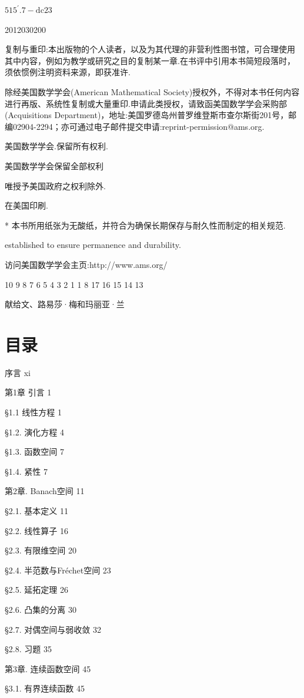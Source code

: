 \documentclass[10pt,b5paper,openany,twoside]{ctexbook}
\begin{document}
${515}^{\prime }{.7} - \mathrm{{dc}}{23}$

2012030200

复制与重印:本出版物的个人读者，以及为其代理的非营利性图书馆，可合理使用其中内容，例如为教学或研究之目的复制某一章.在书评中引用本书简短段落时，须依惯例注明资料来源，即获准许.

除经美国数学学会(American Mathematical Society)授权外，不得对本书任何内容进行再版、系统性复制或大量重印.申请此类授权，请致函美国数学学会采购部(Acquisitions Department)，地址:美国罗德岛州普罗维登斯市查尔斯街201号，邮编02904-2294；亦可通过电子邮件提交申请:reprint-permission@ams.org.

  美国数学学会.保留所有权利.

美国数学学会保留全部权利

唯授予美国政府之权利除外.

在美国印刷.

* 本书所用纸张为无酸纸，并符合为确保长期保存与耐久性而制定的相关规范.

established to ensure permanence and durability.

访问美国数学学会主页:http://www.ams.org/

10 9 8 7 6 5 4 3 2 1 1 8 17 16 15 14 13

献给文、路易莎·梅和玛丽亚·兰

\section*{目录}

序言 xi

第1章 引言 1

§1.1 线性方程 1

§1.2. 演化方程 4

§1.3. 函数空间 7

§1.4. 紧性 7

第2章. Banach空间 11

§2.1. 基本定义 11

§2.2. 线性算子 16

§2.3. 有限维空间 20

§2.4. 半范数与Fréchet空间 23

§2.5. 延拓定理 26

§2.6. 凸集的分离 30

§2.7. 对偶空间与弱收敛 32

§2.8. 习题 35

第3章. 连续函数空间 45

§3.1. 有界连续函数 45
\end{document}
